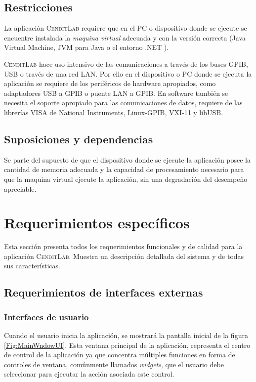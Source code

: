 \documentclass[paper=a4,oneside,fontsize=12pt]{article}
\newcommand{\AppName}{\textsc{CenditLab}\xspace}
\begin{document}
	\subsection{Restricciones}	
	
	La aplicación \AppName requiere que en el PC o dispositivo donde se ejecute se encuentre instalada la \emph{maquina virtual} adecuada y con la versión correcta (Java Virtual Machine, JVM para Java o el entorno .NET ). 
	
	\AppName hace uso intensivo de las comunicaciones a través de los buses GPIB, USB o través de una red LAN. Por ello en el dispositivo o PC donde se ejecuta la aplicación se requiere de los periféricos de hardware apropiados, como adaptadores USB a GPIB o puente LAN a GPIB. En software también se necesita el soporte apropiado para las comunicaciones de datos, requiere de las librerías VISA de National Instruments, Linux-GPIB, VXI-11 y libUSB.	

	\subsection{Suposiciones y dependencias}	
	
	Se parte del supuesto de que el dispositivo donde se ejecute la aplicación posee la cantidad de memoria adecuada y la capacidad de procesamiento necesario para que la maquina virtual ejecute la aplicación, sin una degradación del desempeño apreciable.
	
	\section{Requerimientos específicos}
	
	Esta sección presenta todos los requerimientos funcionales y de calidad para la aplicación \AppName. Muestra un descripción detallada del sistema y de todas sus características.
	
	\subsection{Requerimientos de interfaces externas}
	
	\subsubsection{Interfaces de usuario}
	
	Cuando el usuario inicia la aplicación, se mostrará la pantalla inicial de la figura \ref{Fig:MainWndowUI}. Esta ventana principal de la aplicación, representa el centro de control de la aplicación ya que concentra múltiples funciones en forma de controles de ventana, comúnmente llamados \emph{widgets}, que el usuario debe seleccionar para ejecutar la acción asociada este control. 
	
\end{document}
